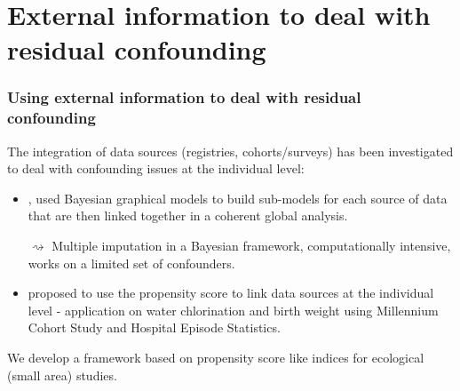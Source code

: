 \documentclass[slidestop,compress,serif,10pt]{beamer}
\begin{document}
\section{External information to deal with residual confounding}
\begin{frame}\frametitle{Using external information to deal with residual confounding}

The integration of data sources (registries, cohorts/surveys) has been investigated to deal with confounding issues at the individual level:

\begin{itemize}
\pause\item \citet{jackson_bayesian_2009}, \citet{molitor_using_2009} used Bayesian graphical models to build sub-models for each source of data that are then linked together in a coherent global analysis. 

$\rightsquigarrow$ Multiple imputation in a Bayesian framework, computationally intensive, works on a limited set of confounders.

\pause\item \citet{Mccandless2012} proposed to use the propensity score to link data sources at the individual level - application on water chlorination and birth weight using Millennium Cohort Study and Hospital Episode Statistics.
\end{itemize}

\pause\vspace{10pt} \begin{center}{\color{red} We develop a framework based on propensity score like indices for ecological (small area) studies.}\end{center}

\end{frame}
\end{document}

